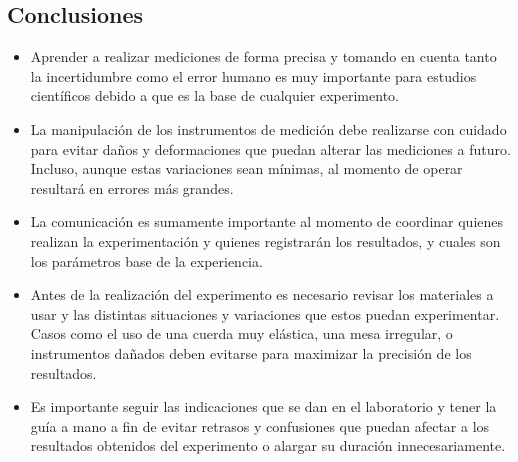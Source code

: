 \subsection{Conclusiones}
\begin{itemize}
    \item Aprender a realizar mediciones de forma precisa y tomando en cuenta tanto la incertidumbre como el error humano es muy importante para estudios científicos debido a que es la base de cualquier experimento.
    \item La manipulación de los instrumentos de medición debe realizarse con cuidado para evitar daños y deformaciones que puedan alterar las mediciones a futuro. Incluso, aunque estas variaciones sean mínimas, al momento de operar resultará en errores más grandes.
    \item La comunicación es sumamente importante al momento de coordinar quienes realizan la experimentación y quienes registrarán los resultados, y cuales son los parámetros base de la experiencia. 
    \item Antes de la realización del experimento es necesario revisar los materiales a usar y las distintas situaciones y variaciones que estos puedan experimentar. Casos como el uso de una cuerda muy elástica, una mesa irregular, o instrumentos dañados deben evitarse para maximizar la precisión de los resultados.
    \item Es importante seguir las indicaciones que se dan en el laboratorio y tener la guía a mano a fin de evitar retrasos y confusiones que puedan afectar a los resultados obtenidos del experimento o alargar su duración innecesariamente.

\end{itemize}
